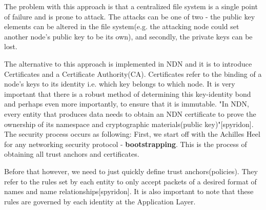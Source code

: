 The problem with this approach is that a centralized file system is a single point of failure and is prone to attack. The attacks can be one of two - the public key elements can be altered in the file system(e.g. the attacking node could set another node's public key to be its own), and secondly, the private keys can be lost.

 The alternative to this approach is implemented in NDN and it is to introduce Certificates and a Certificate Authority(CA). Certificates refer to the binding of a node's keys to its identity i.e. which key belongs to which node. It is very important that there is a robust method of determining this key-identity bond and perhaps even more importantly, to ensure that it is immutable. "In NDN, every entity that produces data needs to obtain an NDN certificate to prove the ownership of its namespace and cryptographic materials(public key)"[spyridon].
 The security process occurs as following: First, we start off with the Achilles Heel for any networking security protocol - \textbf{bootstrapping}. This is the process of obtaining all trust anchors and certificates. 
	 
 Before that however, we need to just quickly define trust anchors(policies). They refer to the rules set by each entity to only accept packets of a desired format of names and name relationships[spyridon]. It is also important to note that these rules are governed by each identity at the Application Layer.
 
